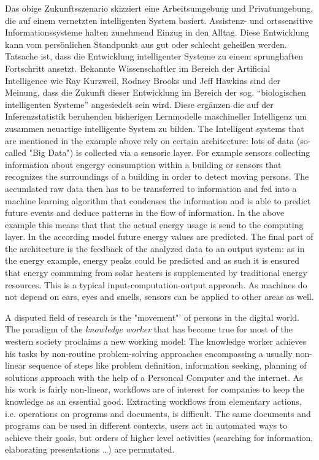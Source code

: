 Das obige Zukunftsszenario skizziert eine Arbeitsumgebung und Privatumgebung, die auf einem vernetzten intelligenten System basiert. Assistenz- und ortssensitive Informationssysteme halten zunehmend Einzug in den Alltag. Diese Entwicklung kann vom persönlichen Standpunkt aus gut oder schlecht geheißen werden. Tatsache ist, dass die Entwicklung intelligenter Systeme zu einem sprunghaften Fortschritt ansetzt. Bekannte Wissenschaftler im Bereich der Artificial Intelligence wie Ray Kurzweil, Rodney Brooks und Jeff Hawkins sind der Meinung, dass die Zukunft dieser Entwicklung im Bereich der sog. "`biologischen intelligenten Systeme"' angesiedelt sein wird. Diese ergänzen die auf der Inferenzstatistik beruhenden bisherigen Lernmodelle maschineller Intelligenz um zusammen neuartige intelligente System zu bilden. The Intelligent systems that are mentioned in the example above rely on certain architecture: lots of data (so-called "Big Data") is collected via a sensoric layer. For example sensors collecting information about engergy consumption within a building or sensors that recognizes the surroundings of a building in order to detect moving persons. The accumlated raw data then has to be transferred to information and fed into a machine learning algorithm that condenses the information and is able to predict future events and deduce patterns in the flow of information. In the above example this means that that the actual energy usage is send to the computing layer. In the according model future energy values are predicted. The final part of the architecture is the feedback of the analyzed data to an output system: as in the energy example, energy peaks could be predicted and as such it is ensured that energy commming from solar heaters is supplemented by traditional energy resources. This is a typical input-computation-output approach. As machines do not depend on ears, eyes and smells, sensors can be applied to other areas as well.

A disputed field of research is the "movement"' of persons in the digital world. The paradigm of the \textit{knowledge worker} that has become true for most of the western society proclaims a new working model:  The knowledge worker achieves his tasks by non-routine problem-solving approaches encompassing a usually non-linear sequence of steps like problem definition, information seeking, planning of solutions approach with the help of a Personcal Computer and the internet. As his work is fairly non-linear, workflows are of interest for companies to keep the knowledge as an essential good. Extracting workflows from elementary actions, i.e. operations on programs and documents, is difficult. The same documents and programs can be used in different contexts, users act in automated ways to achieve their goals, but orders of higher level activities (searching for information, elaborating presentations \dots) are permutated. 

